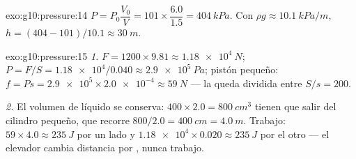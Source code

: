 \begin{solution}{exo:g10:pressure:14}
$P = P_0 \dfrac{V_0}{V} = 101 \times \dfrac{6.0}{1.5} =
\qty{404}{kPa}$. Con $\rho g \approx \qty{10.1}{kPa/m}$,
$h = (404 - 101)/10.1 \approx \qty{30}{m}$.
\end{solution}

\begin{solution}{exo:g10:pressure:15}
\emph{1.}  $F = 1200 \times 9.81 \approx \qty{1.18e4}{N}$; 
$P = F/S = \num{1.18e4}/0.040 \approx \qty{2.9e5}{Pa}$; pistón pequeño:
$f = P s = \num{2.9e5} \times \num{2.0e-4} \approx \qty{59}{N}$ --- la
 queda dividida entre $S/s = 200$.

\emph{2.} El volumen de líquido se conserva:
$400 \times 2.0 = \qty{800}{cm^3}$ tienen que salir del cilindro
pequeño, que recorre $800/2.0 = \qty{400}{cm} = \qty{4.0}{m}$. Trabajo:
$59 \times 4.0 \approx \qty{235}{J}$ por un lado y
$\num{1.18e4} \times 0.020 \approx \qty{235}{J}$ por el otro --- el
elevador cambia distancia por , nunca trabajo.
\end{solution}

